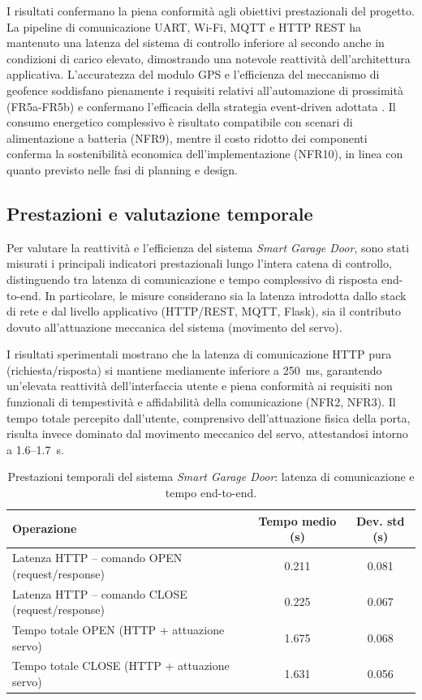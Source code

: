 I risultati confermano la piena conformità agli obiettivi prestazionali del progetto. La pipeline di comunicazione UART, Wi-Fi, MQTT e HTTP REST ha mantenuto una latenza del sistema di controllo inferiore al secondo anche in condizioni di carico elevato, dimostrando una notevole reattività dell’architettura applicativa. L'accuratezza del modulo GPS e l'efficienza del meccanismo di geofence soddisfano pienamente i requisiti relativi all'automazione di prossimità (FR5a-FR5b) e confermano l'efficacia della strategia event-driven adottata \cite{Sanchez2018}. Il consumo energetico complessivo è risultato compatibile con scenari di alimentazione a batteria (NFR9), mentre il costo ridotto dei componenti conferma la sostenibilità economica dell'implementazione (NFR10), in linea con quanto previsto nelle fasi di planning e design.


\subsection{Prestazioni e valutazione temporale}

Per valutare la reattività e l’efficienza del sistema \textit{Smart Garage Door}, sono stati misurati i principali indicatori prestazionali lungo l’intera catena di controllo, distinguendo tra latenza di comunicazione e tempo complessivo di risposta end-to-end. In particolare, le misure considerano sia la latenza introdotta dallo stack di rete e dal livello applicativo (HTTP/REST, MQTT, Flask), sia il contributo dovuto all’attuazione meccanica del sistema (movimento del servo).

I risultati sperimentali mostrano che la latenza di comunicazione HTTP pura (richiesta/risposta) si mantiene mediamente inferiore a 250~ms, garantendo un’elevata reattività dell’interfaccia utente e piena conformità ai requisiti non funzionali di tempestività e affidabilità della comunicazione (NFR2, NFR3). Il tempo totale percepito dall’utente, comprensivo dell’attuazione fisica della porta, risulta invece dominato dal movimento meccanico del servo, attestandosi intorno a 1.6–1.7~s.

\begin{table}[h!]
    \centering
    \caption{Prestazioni temporali del sistema \textit{Smart Garage Door}: latenza di comunicazione e tempo end-to-end.}
    \label{tab:performance}
    \begin{tabular}{|p{6.5cm}|c|c|}
    \hline
    \textbf{Operazione} & \textbf{Tempo medio (s)} & \textbf{Dev. std (s)} \\ \hline
    Latenza HTTP -- comando OPEN (request/response) & 0.211 & 0.081 \\ \hline
    Latenza HTTP -- comando CLOSE (request/response) & 0.225 & 0.067 \\ \hline
    Tempo totale OPEN (HTTP + attuazione servo) & 1.675 & 0.068 \\ \hline
    Tempo totale CLOSE (HTTP + attuazione servo) & 1.631 & 0.056 \\ \hline
    \end{tabular}
\end{table}

